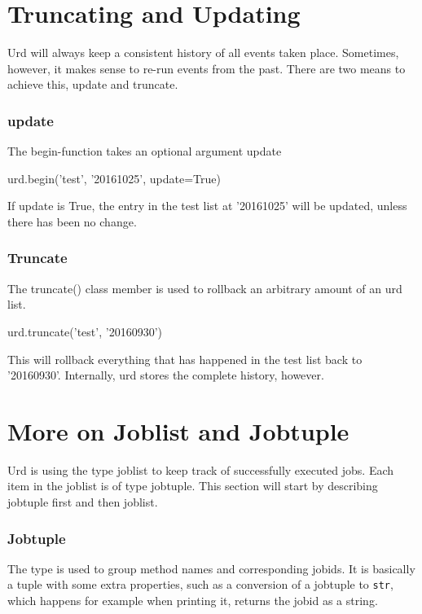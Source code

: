 \section{Truncating and Updating}

Urd will always keep a consistent history of all events taken place.
Sometimes, however, it makes sense to re-run events from the past.
There are two means to achieve this, update and truncate.

\subsubsection{update}
The begin-function takes an optional argument update

\begin{python}
  urd.begin('test', '20161025', update=True)
\end{python}
If update is True, the entry in the test list at '20161025' will be
updated, unless there has been no change.

\subsubsection{Truncate}

The truncate() class member is used to rollback an arbitrary amount of
an urd list.

\begin{python}
  urd.truncate('test', '20160930')
\end{python}
This will rollback everything that has happened in the test list back
to '20160930'.  Internally, urd stores the complete history, however.



\newpage
\section{More on Joblist and Jobtuple}

Urd is using the type joblist to keep track of successfully executed
jobs.  Each item in the joblist is of type jobtuple.  This section
will start by describing jobtuple first and then joblist.

\subsubsection{Jobtuple}

The \jobtuple type is used to group method names and corresponding
jobids.  It is basically a tuple with some extra properties, such as a
conversion of a jobtuple to \texttt{str}, which happens for example
when printing it, returns the jobid as a string.

